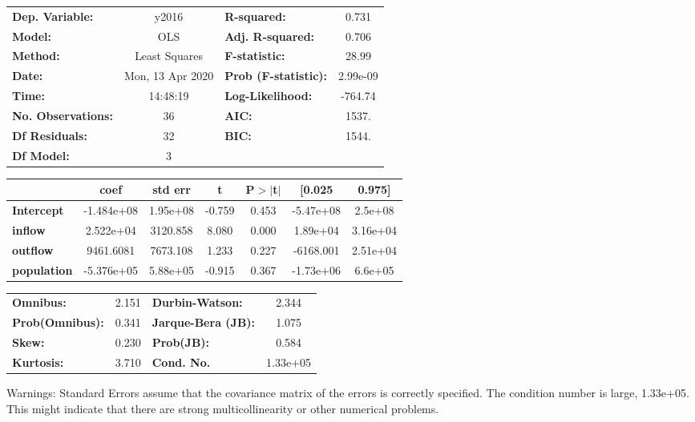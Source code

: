 \begin{center}
\begin{tabular}{lclc}
\toprule
\textbf{Dep. Variable:}    &      y2016       & \textbf{  R-squared:         } &     0.731   \\
\textbf{Model:}            &       OLS        & \textbf{  Adj. R-squared:    } &     0.706   \\
\textbf{Method:}           &  Least Squares   & \textbf{  F-statistic:       } &     28.99   \\
\textbf{Date:}             & Mon, 13 Apr 2020 & \textbf{  Prob (F-statistic):} &  2.99e-09   \\
\textbf{Time:}             &     14:48:19     & \textbf{  Log-Likelihood:    } &   -764.74   \\
\textbf{No. Observations:} &          36      & \textbf{  AIC:               } &     1537.   \\
\textbf{Df Residuals:}     &          32      & \textbf{  BIC:               } &     1544.   \\
\textbf{Df Model:}         &           3      & \textbf{                     } &             \\
\bottomrule
\end{tabular}
\begin{tabular}{lcccccc}
                    & \textbf{coef} & \textbf{std err} & \textbf{t} & \textbf{P$> |$t$|$} & \textbf{[0.025} & \textbf{0.975]}  \\
\midrule
\textbf{Intercept}  &   -1.484e+08  &     1.95e+08     &    -0.759  &         0.453        &    -5.47e+08    &      2.5e+08     \\
\textbf{inflow}     &    2.522e+04  &     3120.858     &     8.080  &         0.000        &     1.89e+04    &     3.16e+04     \\
\textbf{outflow}    &    9461.6081  &     7673.108     &     1.233  &         0.227        &    -6168.001    &     2.51e+04     \\
\textbf{population} &   -5.376e+05  &     5.88e+05     &    -0.915  &         0.367        &    -1.73e+06    &      6.6e+05     \\
\bottomrule
\end{tabular}
\begin{tabular}{lclc}
\textbf{Omnibus:}       &  2.151 & \textbf{  Durbin-Watson:     } &    2.344  \\
\textbf{Prob(Omnibus):} &  0.341 & \textbf{  Jarque-Bera (JB):  } &    1.075  \\
\textbf{Skew:}          &  0.230 & \textbf{  Prob(JB):          } &    0.584  \\
\textbf{Kurtosis:}      &  3.710 & \textbf{  Cond. No.          } & 1.33e+05  \\
\bottomrule
\end{tabular}
\end{center}

Warnings: \newline
 [1] Standard Errors assume that the covariance matrix of the errors is correctly specified. \newline
 [2] The condition number is large, 1.33e+05. This might indicate that there are \newline
 strong multicollinearity or other numerical problems.
